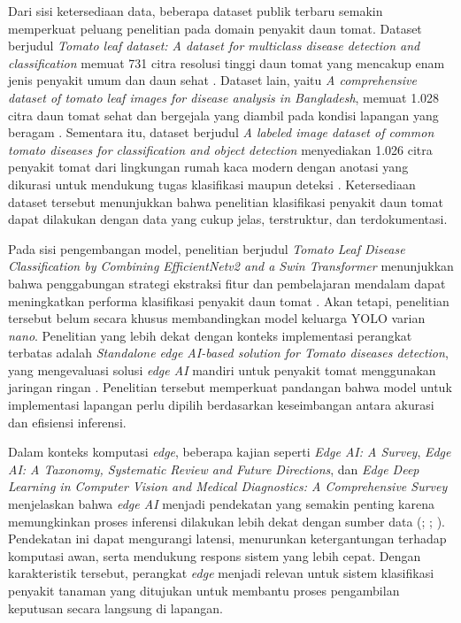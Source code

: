 \begin{sectioncontent}
    Dari sisi ketersediaan data, beberapa dataset publik terbaru semakin memperkuat peluang penelitian pada domain penyakit daun tomat. Dataset berjudul \textit{Tomato leaf dataset: A dataset for multiclass disease detection and classification} memuat 731 citra resolusi tinggi daun tomat yang mencakup enam jenis penyakit umum dan daun sehat \citep[hlm. 1]{imtiaz2025dataset}. Dataset lain, yaitu \textit{A comprehensive dataset of tomato leaf images for disease analysis in Bangladesh}, memuat 1.028 citra daun tomat sehat dan bergejala yang diambil pada kondisi lapangan yang beragam \citep[hlm. 1--2]{oni2025dataset}. Sementara itu, dataset berjudul \textit{A labeled image dataset of common tomato diseases for classification and object detection} menyediakan 1.026 citra penyakit tomat dari lingkungan rumah kaca modern dengan anotasi yang dikurasi untuk mendukung tugas klasifikasi maupun deteksi \citep[hlm. 1--2]{liu2025dataset}. Ketersediaan dataset tersebut menunjukkan bahwa penelitian klasifikasi penyakit daun tomat dapat dilakukan dengan data yang cukup jelas, terstruktur, dan terdokumentasi.

    Pada sisi pengembangan model, penelitian berjudul \textit{Tomato Leaf Disease Classification by Combining EfficientNetv2 and a Swin Transformer} menunjukkan bahwa penggabungan strategi ekstraksi fitur dan pembelajaran mendalam dapat meningkatkan performa klasifikasi penyakit daun tomat \citep[hlm. 1--2 dan 7--9]{sun2024tomatoclassification}. Akan tetapi, penelitian tersebut belum secara khusus membandingkan model keluarga YOLO varian \textit{nano}. Penelitian yang lebih dekat dengan konteks implementasi perangkat terbatas adalah \textit{Standalone edge AI-based solution for Tomato diseases detection}, yang mengevaluasi solusi \textit{edge AI} mandiri untuk penyakit tomat menggunakan jaringan ringan \citep[hlm. 1, 6--7, dan 10--13]{majeed2024edge}. Penelitian tersebut memperkuat pandangan bahwa model untuk implementasi lapangan perlu dipilih berdasarkan keseimbangan antara akurasi dan efisiensi inferensi.

    Dalam konteks komputasi \textit{edge}, beberapa kajian seperti \textit{Edge AI: A Survey}, \textit{Edge AI: A Taxonomy, Systematic Review and Future Directions}, dan \textit{Edge Deep Learning in Computer Vision and Medical Diagnostics: A Comprehensive Survey} menjelaskan bahwa \textit{edge AI} menjadi pendekatan yang semakin penting karena memungkinkan proses inferensi dilakukan lebih dekat dengan sumber data (\citealp[hlm. 71--74]{singh2023edge}; \citealp[hlm. 1--4]{gill2025taxonomy}; \citealp[hlm. 1--6]{xu2025edge}). Pendekatan ini dapat mengurangi latensi, menurunkan ketergantungan terhadap komputasi awan, serta mendukung respons sistem yang lebih cepat. Dengan karakteristik tersebut, perangkat \textit{edge} menjadi relevan untuk sistem klasifikasi penyakit tanaman yang ditujukan untuk membantu proses pengambilan keputusan secara langsung di lapangan.


\end{sectioncontent}
